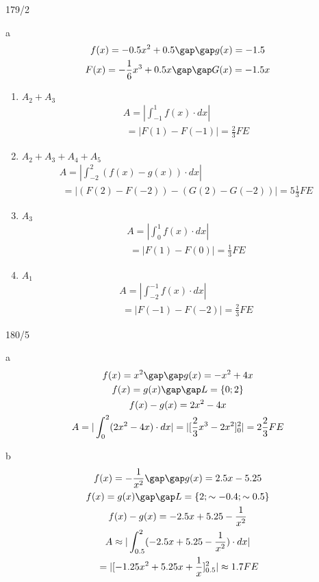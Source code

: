 \begin{exercise}{179/2}
  \item [a]
  \begin{gather*}
    f(x) = -0.5x^2 + 0.5 \gap\gap g(x) = -1.5 \\
    F(x) = -\frac{1}{6}x^3 + 0.5x \gap\gap G(x) = -1.5x
  \end{gather*}
  \begin{enumerate}[I]
    \item $A_2 + A_3$
    \begin{gather*}
      A = |\int_{-1}^1 f(x) \cdot dx| \\
      \;= |F(1) - F(-1)| = \frac{2}{3}FE
    \end{gather*}
    \item $A_2 + A_3 + A_4 + A_5$
    \begin{gather*}
      A = |\int_{-2}^2 (f(x) - g(x)) \cdot dx| \\
      \;= |(F(2) - F(-2)) - (G(2) - G(-2))| = 5\frac{1}{3}FE
    \end{gather*}
    \item $A_3$
    \begin{gather*}
      A = |\int_0^1 f(x) \cdot dx| \\
      \;= |F(1) - F(0)| = \frac{1}{3}FE
    \end{gather*}
    \item $A_1$
    \begin{gather*}
      A = |\int_{-2}^{-1} f(x) \cdot dx| \\
      \;= |F(-1) - F(-2)| = \frac{2}{3}FE
    \end{gather*}
  \end{enumerate}
\end{exercise}
\begin{exercise}{180/5}
  \item [a]
  \begin{gather*}
    f(x) = x^2 \gap\gap g(x) = -x^2 + 4x \\
    f(x) = g(x) \gap\gap L = \{0; 2\} \\
    f(x) - g(x) = 2x^2 - 4x \\
    A = |\int_0^2 (2x^2 - 4x) \cdot dx| = |[\frac{2}{3}x^3 - 2x^2]_0^2| = 2\frac{2}{3}FE
  \end{gather*}
  \item [b]
  \begin{gather*}
    f(x) = -\frac{1}{x^2} \gap\gap g(x) = 2.5x - 5.25 \\
    f(x) = g(x) \gap\gap L = \{2; \sim -0.4; \sim 0.5\} \\
    f(x) - g(x) = -2.5x + 5.25 - \frac{1}{x^2} \\
    A \approx |\int_{0.5}^2 (-2.5x + 5.25 - \frac{1}{x^2}) \cdot dx| \\
    \;= |[-1.25x^2 + 5.25x + \frac{1}{x}]_{0.5}^2| \approx 1.7FE
  \end{gather*}
\end{exercise}
